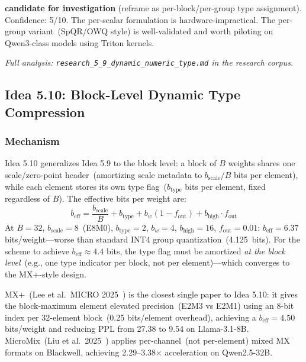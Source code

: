 \documentclass[11pt]{article}
\begin{document}
\noindent\textbf{candidate for investigation} (reframe as per-block/per-group type assignment). Confidence: 5/10. The per-scalar formulation is hardware-impractical. The per-group variant~(SpQR/OWQ style) is well-validated and worth piloting on Qwen3-class models using Triton kernels.

\par\noindent\textit{Full analysis: \texttt{research\_5\_9\_dynamic\_numeric\_type.md} in the research corpus.}


\subsection{Idea 5.10: Block-Level Dynamic Type Compression}
\label{subsec:idea510}

\subsubsection*{Mechanism}

Idea 5.10 generalizes Idea 5.9 to the block level: a block of $B$ weights shares one scale/zero-point header~(amortizing scale metadata to $b_{\text{scale}}/B$ bits per element), while each element stores its own type flag~($b_{\text{type}}$ bits per element, fixed regardless of $B$). The effective bits per weight are:
\[
b_{\text{eff}} = \frac{b_{\text{scale}}}{B} + b_{\text{type}} + b_w(1-f_{\text{out}}) + b_{\text{high}} \cdot f_{\text{out}}
\]
At $B{=}32$, $b_{\text{scale}}{=}8$~(E8M0), $b_{\text{type}}{=}2$, $b_w{=}4$, $b_{\text{high}}{=}16$, $f_{\text{out}}{=}0.01$: $b_{\text{eff}} {=} 6.37$ bits/weight---worse than standard INT4 group quantization~(4.125~bits). For the scheme to achieve $b_{\text{eff}} \approx 4.4$ bits, the type flag must be amortized \emph{at the block level}~(e.g., one type indicator per block, not per element)---which converges to the MX+-style design.

MX+~(Lee et al.\ MICRO 2025~\cite{LeeMXplus2025}) is the closest single paper to Idea 5.10: it gives the block-maximum element elevated precision~(E2M3 vs E2M1) using an 8-bit index per 32-element block~(0.25 bits/element overhead), achieving a $b_{\text{eff}}{=}4.50$ bits/weight and reducing PPL from 27.38 to 9.54 on Llama-3.1-8B. MicroMix~(Liu et al.\ 2025~\cite{LiuMicroMix2025}) applies per-channel~(not per-element) mixed MX formats on Blackwell, achieving 2.29--3.38$\times$ acceleration on Qwen2.5-32B.
\end{document}
